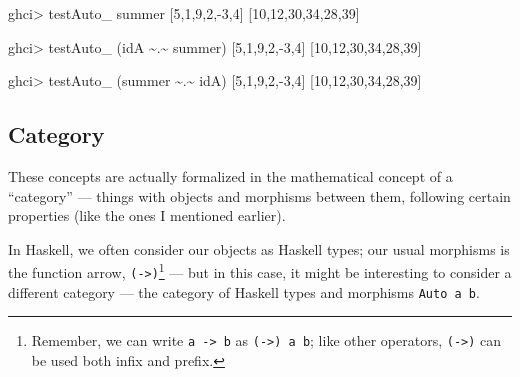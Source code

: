 \documentclass[]{article}
\newenvironment{Shaded}{}{}
\newcommand{\DecValTok}[1]{\textcolor[rgb]{0.25,0.63,0.44}{#1}}
\newcommand{\NormalTok}[1]{#1}
\newcommand{\OperatorTok}[1]{\textcolor[rgb]{0.40,0.40,0.40}{#1}}
\begin{document}
\begin{Shaded}
\begin{Highlighting}[]
\NormalTok{ghci}\OperatorTok{\textgreater{}}\NormalTok{ testAuto\_ summer [}\DecValTok{5}\NormalTok{,}\DecValTok{1}\NormalTok{,}\DecValTok{9}\NormalTok{,}\DecValTok{2}\NormalTok{,}\OperatorTok{{-}}\DecValTok{3}\NormalTok{,}\DecValTok{4}\NormalTok{]}
\NormalTok{[}\DecValTok{10}\NormalTok{,}\DecValTok{12}\NormalTok{,}\DecValTok{30}\NormalTok{,}\DecValTok{34}\NormalTok{,}\DecValTok{28}\NormalTok{,}\DecValTok{39}\NormalTok{]}

\NormalTok{ghci}\OperatorTok{\textgreater{}}\NormalTok{ testAuto\_ (idA }\OperatorTok{\textasciitilde{}.\textasciitilde{}}\NormalTok{ summer) [}\DecValTok{5}\NormalTok{,}\DecValTok{1}\NormalTok{,}\DecValTok{9}\NormalTok{,}\DecValTok{2}\NormalTok{,}\OperatorTok{{-}}\DecValTok{3}\NormalTok{,}\DecValTok{4}\NormalTok{]}
\NormalTok{[}\DecValTok{10}\NormalTok{,}\DecValTok{12}\NormalTok{,}\DecValTok{30}\NormalTok{,}\DecValTok{34}\NormalTok{,}\DecValTok{28}\NormalTok{,}\DecValTok{39}\NormalTok{]}

\NormalTok{ghci}\OperatorTok{\textgreater{}}\NormalTok{ testAuto\_ (summer }\OperatorTok{\textasciitilde{}.\textasciitilde{}}\NormalTok{ idA) [}\DecValTok{5}\NormalTok{,}\DecValTok{1}\NormalTok{,}\DecValTok{9}\NormalTok{,}\DecValTok{2}\NormalTok{,}\OperatorTok{{-}}\DecValTok{3}\NormalTok{,}\DecValTok{4}\NormalTok{]}
\NormalTok{[}\DecValTok{10}\NormalTok{,}\DecValTok{12}\NormalTok{,}\DecValTok{30}\NormalTok{,}\DecValTok{34}\NormalTok{,}\DecValTok{28}\NormalTok{,}\DecValTok{39}\NormalTok{]}
\end{Highlighting}
\end{Shaded}

\subsection{Category}\label{category}

These concepts are actually formalized in the mathematical concept of a
``category'' --- things with objects and morphisms between them, following
certain properties (like the ones I mentioned earlier).

In Haskell, we often consider our objects as Haskell types; our usual morphisms
is the function arrow, \texttt{(-\textgreater{})}\footnote{Remember, we can
  write \texttt{a\ -\textgreater{}\ b} as \texttt{(-\textgreater{})\ a\ b}; like
  other operators, \texttt{(-\textgreater{})} can be used both infix and prefix.}
--- but in this case, it might be interesting to consider a different category
--- the category of Haskell types and morphisms \texttt{Auto\ a\ b}.
\end{document}
